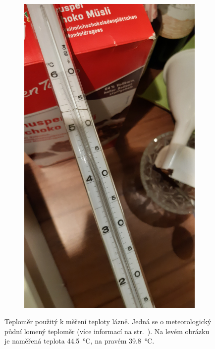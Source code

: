 \documentclass[12pt]{article}
\begin{document}
\begin{figure}[h!]
\begin{subfigure}[b]{.5\textwidth}
        \includegraphics[angle = 270, width = \textwidth]{prilohy/teploměr_2.jpg}
    \end{subfigure}
    \caption{Teploměr použitý k měření teploty lázně. Jedná se o meteorologický půdní lomený teploměr (více informací na str.~\pageref{sec:teploměr}). Na levém obrázku je naměřená teplota \SI{44,5}{\degreeCelsius}, na pravém \SI{39,8}{\degreeCelsius}.}
    \label{fig:teploměr}
\end{figure}
\end{document}
